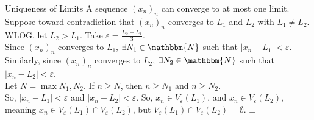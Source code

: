 \documentclass[10pt]{extarticle}
\newcommand{\N}{\mathbbm{N}}
\begin{document}
  \begin{problem}{Uniqueness of Limits}
    A sequence $\left(x_n\right)_n$ can converge to at most one limit.
    \tcblower
    Suppose toward contradiction that $\left(x_n\right)_n$ converges to $L_1$ and $L_2$ with $L_1 \neq L_2$.\\

    WLOG, let $L_2 > L_1$. Take $\varepsilon = \frac{L_2 - L_1}{3}$. \\

    Since $(x_n)_n$ converges to $L_1$, $\exists N_1\in \N$ such that $|x_n - L_1| < \varepsilon$. Similarly, since $(x_n)_n$ converges to $L_2$, $\exists N_2\in \N$ such that $|x_n - L_2| < \varepsilon$.\\

    Let $N = \max{N_1,N_2}$. If $n \geq N$, then $n\geq N_1$ and $n\geq N_2$.\\

    So, $|x_n - L_1| < \varepsilon$ and $|x_n - L_2| < \varepsilon$. So, $x_n\in V_{\varepsilon}(L_1)$, and $x_n\in V_{\varepsilon}(L_2)$, meaning $x_n\in V_{\varepsilon}(L_1)\cap V_{\varepsilon}(L_2)$, but $V_{\varepsilon}(L_1)\cap V_{\varepsilon}(L_2) = \emptyset$. $\bot$
  \end{problem}
\end{document}
